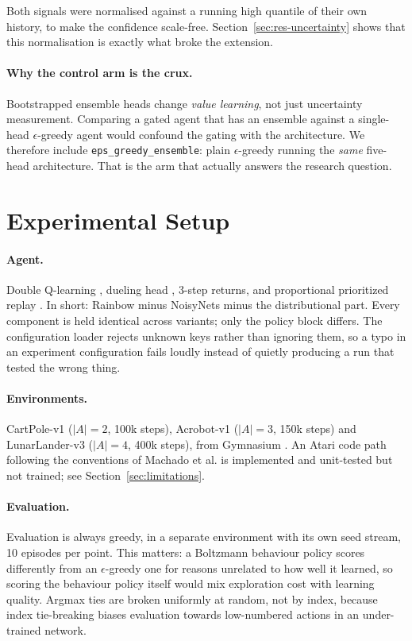 \documentclass[11pt,a4paper]{article}
\begin{document}
Both signals were normalised against a running high quantile of their own
history, to make the confidence scale-free.
Section~\ref{sec:res-uncertainty} shows that this normalisation is exactly
what broke the extension.

\paragraph{Why the control arm is the crux.}
Bootstrapped ensemble heads change \emph{value learning}, not just uncertainty
measurement. Comparing a gated agent that has an ensemble against a
single-head $\epsilon$-greedy agent would confound the gating with the
architecture. We therefore include \texttt{eps\_greedy\_ensemble}: plain
$\epsilon$-greedy running the \emph{same} five-head architecture. That is the
arm that actually answers the research question.

\section{Experimental Setup}
\label{sec:setup}

\paragraph{Agent.}
Double Q-learning \cite{vanhasselt2016}, dueling head \cite{wang2016}, 3-step
returns, and proportional prioritized replay \cite{schaul2016}. In short:
Rainbow minus NoisyNets minus the distributional part. Every component is held
identical across variants; only the policy block differs. The configuration
loader rejects unknown keys rather than ignoring them, so a typo in an
experiment configuration fails loudly instead of quietly producing a run that
tested the wrong thing.

\paragraph{Environments.}
CartPole-v1 ($|A| = 2$, 100k steps), Acrobot-v1 ($|A| = 3$, 150k steps) and
LunarLander-v3 ($|A| = 4$, 400k steps), from Gymnasium \cite{towers2024}. An
Atari code path following the conventions of Machado et al.
\cite{machado2018} is implemented and unit-tested but not trained; see
Section~\ref{sec:limitations}.

\paragraph{Evaluation.}
Evaluation is always greedy, in a separate environment with its own seed
stream, 10 episodes per point. This matters: a Boltzmann behaviour policy
scores differently from an $\epsilon$-greedy one for reasons unrelated to how
well it learned, so scoring the behaviour policy itself would mix exploration
cost with learning quality. Argmax ties are broken uniformly at random, not by
index, because index tie-breaking biases evaluation towards low-numbered
actions in an under-trained network.
\end{document}
